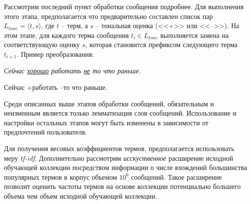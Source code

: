     Рассмотрим последний пункт обработки сообщения подробнее.
    Для выполнения этого этапа, предполагается что предварительно составлен
    список пар $L_{tone} = {\langle t, s\rangle}$, где $t$ -- терм, а $s$ --
    тональная оценка (<<+>> или <<-->>). На этом этапе, для каждого терма сообщения $t_i \in L_{tone}$
    выполняется замена на соответствующую оценку $s$, которая становится префиксом
    следующего терма $t_{i+1}$. Пример преобразования:
    \begin{center}
        \it
        Сейчас \underline{хорошо} работать \underline{не} то что раньше.

        Сейчас +работать --то что раньше.
    \end{center}

    Среди описанных выше этапов обработки сообщений, обязательным и неизменным
    является только лемматизация слов сообщений. Использование и настройки
    остальных этапов могут быть изменены в зависимости от предпочтений
    пользователя.

    Для получения весовых коэффициентов термов, предполагается использовать меру {\it tf-idf}.
    Дополнительно рассмотрим {\it исскуственное} расширение исходной
    обучающей коллекции посредством информации о числе вхождений большинства
    популярных термов в корпус объемом $10^6$ сообщений. Такое расширение
    позволит оценить частоты термов на основе коллекции потенциально
    большего объема чем объем исходной обучающей коллекции.

